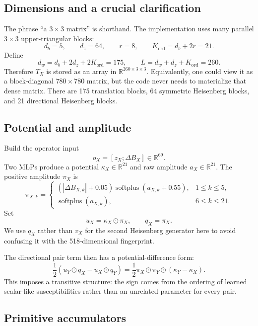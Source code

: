 \documentclass[11pt,a4paper]{article}
\newcommand{\R}{\mathbb{R}}
\newcommand{\od}{\odot}
\newcommand{\dB}{\Delta B}
\newcommand{\softplus}{\operatorname{softplus}}
\begin{document}
\subsection{Dimensions and a crucial clarification}

The phrase ``a $3\times3$ matrix'' is shorthand.  The implementation uses many
parallel $3\times3$ upper-triangular blocks:
\[
d_b=5,
\qquad d_z=64,
\qquad r=8,
\qquad K_{\mathrm{ord}}=d_b+2r=21.
\]
Define
\[
d_w=d_b+2d_z+2K_{\mathrm{ord}}=175,
\qquad
L=d_w+d_z+K_{\mathrm{ord}}=260.
\]
Therefore $T_X$ is stored as an array in $\R^{260\times3\times3}$.  Equivalently,
one could view it as a block-diagonal $780\times780$ matrix, but the code never
needs to materialize that dense matrix.  There are 175 translation blocks, 64
symmetric Heisenberg blocks, and 21 directional Heisenberg blocks.

\subsection{Potential and amplitude}

Build the operator input
\[
o_X=[z_X;\dB_X]\in\R^{69}.
\]
Two MLPs produce a potential $\kappa_X\in\R^{21}$ and raw amplitude
$a_X\in\R^{21}$.  The positive amplitude $\pi_X$ is
\begin{equation}
\pi_{X,k}=
\begin{cases}
(|\dB_{X,k}|+0.05)\softplus(a_{X,k}+0.55),&1\le k\le5,\\
\softplus(a_{X,k}),&6\le k\le21.
\end{cases}
\label{eq:pi}
\end{equation}
Set
\begin{equation}
u_X=\kappa_X\od\pi_X,
\qquad q_X=\pi_X.
\label{eq:uq}
\end{equation}
We use $q_X$ rather than $v_X$ for the second Heisenberg generator here to
avoid confusing it with the 518-dimensional fingerprint.

The directional pair term then has a potential-difference form:
\begin{equation}
\frac12(u_Y\od q_X-u_X\od q_Y)
=\frac12\pi_X\od\pi_Y\od(\kappa_Y-\kappa_X).
\label{eq:potentialdiff}
\end{equation}
This imposes a transitive structure: the sign comes from the ordering of
learned scalar-like susceptibilities rather than an unrelated parameter for
every pair.

\subsection{Primitive accumulators}
\end{document}
